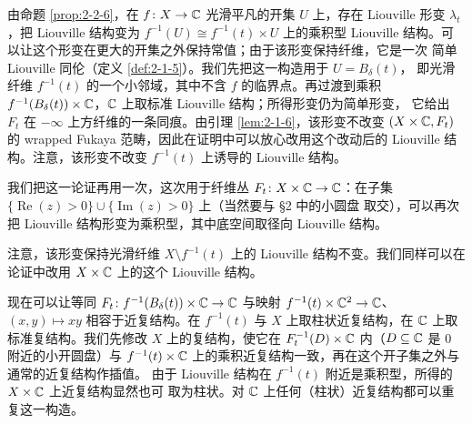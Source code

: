 
由命题 \ref{prop:2-2-6}，在 $f\colon X\to\mathbb{C}$ 光滑平凡的开集 $U$ 上，存在 Liouville
形变 $\lambda_t$，把 Liouville 结构变为 $f^{-1}(U)\cong f^{-1}(t)\times U$ 上的乘积型
Liouville 结构。可以让这个形变在更大的开集之外保持常值；由于该形变保持纤维，它是一次
简单 Liouville 同伦（定义 \ref{def:2-1-5}）。我们先把这一构造用于 $U=B_\delta(t)$，
即光滑纤维 $f^{-1}(t)$ 的一个小邻域，其中不含 $f$ 的临界点。再过渡到乘积
$f^{-1}(B_\delta(t))\times\mathbb{C}$，$\mathbb{C}$ 上取标准 Liouville 结构；所得形变仍为简单形变，
它给出 $F_t$ 在 $-\infty$ 上方纤维的一条同痕。由引理 \ref{lem:2-1-6}，该形变不改变
$(X\times\mathbb{C},F_t)$ 的 wrapped Fukaya 范畴，因此在证明中可以放心改用这个改动后的
Liouville 结构。注意，该形变不改变 $f^{-1}(t)$ 上诱导的 Liouville 结构。


我们把这一论证再用一次，这次用于纤维丛 $F_t\colon X\times\mathbb{C}\to\mathbb{C}$：在子集
$\{\operatorname{Re}(z)>0\}\cup\{\operatorname{Im}(z)>0\}$ 上（当然要与 §2 中的小圆盘
取交），可以再次把 Liouville 结构形变为乘积型，其中底空间取径向 Liouville 结构。


注意，该形变保持光滑纤维 $X\setminus f^{-1}(t)$ 上的 Liouville 结构不变。我们同样可以在
论证中改用 $X\times\mathbb{C}$ 上的这个 Liouville 结构。

现在可以让等同 $F_t\colon f^{-1}(B_\delta(t))\times\mathbb{C}\to\mathbb{C}$ 与映射
$f^{-1}(t)\times\mathbb{C}^2\to\mathbb{C}$、$(x,y)\mapsto xy$ 相容于近复结构。在 $f^{-1}(t)$ 与 $X$
上取柱状近复结构，在 $\mathbb{C}$ 上取标准复结构。我们先修改 $X$ 上的复结构，使它在
$F_t^{-1}(D)\times\mathbb{C}$ 内（$D\subseteq\mathbb{C}$ 是 $0$ 附近的小开圆盘）与
$f^{-1}(t)\times\mathbb{C}$ 上的乘积近复结构一致，再在这个开子集之外与通常的近复结构作插值。
由于 Liouville 结构在 $f^{-1}(t)$ 附近是乘积型，所得的 $X\times\mathbb{C}$ 上近复结构显然也可
取为柱状。对 $\mathbb{C}$ 上任何（柱状）近复结构都可以重复这一构造。


